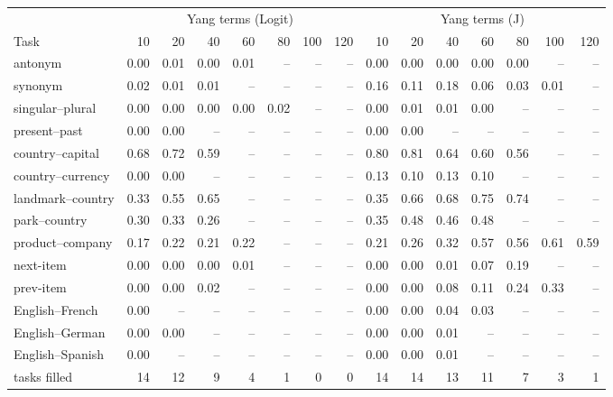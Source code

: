 \begin{tabular}{@{}lrrrrrrrrrrrrrr@{}}
\toprule
& \multicolumn{7}{c}{Yang terms (Logit)} & \multicolumn{7}{c}{Yang terms (J)} \\
\cmidrule(lr){2-8} \cmidrule(lr){9-15}
Task & 10 & 20 & 40 & 60 & 80 & 100 & 120 & 10 & 20 & 40 & 60 & 80 & 100 & 120 \\
\midrule
antonym & 0.00 & 0.01 & 0.00 & 0.01 & -- & -- & -- & 0.00 & 0.00 & 0.00 & 0.00 & 0.00 & -- & -- \\
synonym & 0.02 & 0.01 & 0.01 & -- & -- & -- & -- & 0.16 & 0.11 & 0.18 & 0.06 & 0.03 & 0.01 & -- \\
singular--plural & 0.00 & 0.00 & 0.00 & 0.00 & 0.02 & -- & -- & 0.00 & 0.01 & 0.01 & 0.00 & -- & -- & -- \\
present--past & 0.00 & 0.00 & -- & -- & -- & -- & -- & 0.00 & 0.00 & -- & -- & -- & -- & -- \\
country--capital & 0.68 & 0.72 & 0.59 & -- & -- & -- & -- & 0.80 & 0.81 & 0.64 & 0.60 & 0.56 & -- & -- \\
country--currency & 0.00 & 0.00 & -- & -- & -- & -- & -- & 0.13 & 0.10 & 0.13 & 0.10 & -- & -- & -- \\
landmark--country & 0.33 & 0.55 & 0.65 & -- & -- & -- & -- & 0.35 & 0.66 & 0.68 & 0.75 & 0.74 & -- & -- \\
park--country & 0.30 & 0.33 & 0.26 & -- & -- & -- & -- & 0.35 & 0.48 & 0.46 & 0.48 & -- & -- & -- \\
product--company & 0.17 & 0.22 & 0.21 & 0.22 & -- & -- & -- & 0.21 & 0.26 & 0.32 & 0.57 & 0.56 & 0.61 & 0.59 \\
next-item & 0.00 & 0.00 & 0.00 & 0.01 & -- & -- & -- & 0.00 & 0.00 & 0.01 & 0.07 & 0.19 & -- & -- \\
prev-item & 0.00 & 0.00 & 0.02 & -- & -- & -- & -- & 0.00 & 0.00 & 0.08 & 0.11 & 0.24 & 0.33 & -- \\
English--French & 0.00 & -- & -- & -- & -- & -- & -- & 0.00 & 0.00 & 0.04 & 0.03 & -- & -- & -- \\
English--German & 0.00 & 0.00 & -- & -- & -- & -- & -- & 0.00 & 0.00 & 0.01 & -- & -- & -- & -- \\
English--Spanish & 0.00 & -- & -- & -- & -- & -- & -- & 0.00 & 0.00 & 0.01 & -- & -- & -- & -- \\
\midrule
tasks filled & 14 & 12 & 9 & 4 & 1 & 0 & 0 & 14 & 14 & 13 & 11 & 7 & 3 & 1 \\
\bottomrule
\end{tabular}
